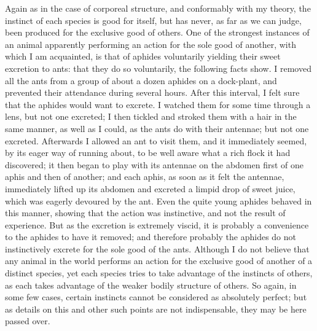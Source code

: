 \indent Again as in the case of corporeal structure, and conformably with my theory, the instinct of each species is good for itself, but has never, as far as we can judge, been produced for the exclusive good of others. One of the strongest instances of an animal apparently performing an action for the sole good of another, with which I am acquainted, is that of aphides voluntarily yielding their sweet excretion to ants: that they do so voluntarily, the following facts show. I removed all the ants from a group of about a dozen aphides on a dock-plant, and prevented their attendance during several hours. After this interval, I felt sure that the aphides would want to excrete. I watched them for some time through a lens, but not one excreted; I then tickled and stroked them with a hair in the same manner, as well as I could, as the ants do with their antennae; but not one excreted. Afterwards I allowed an ant to visit them, and it immediately seemed, by its eager way of running about, to be well aware what a rich flock it had discovered; it then began to play with its antennae on the abdomen first of one aphis and then of another; and each aphis, as soon as it felt the antennae, immediately lifted up its abdomen and excreted a limpid drop of sweet juice, which was eagerly devoured by the ant. Even the quite young aphides behaved in this manner, showing that the action was instinctive, and not the result of experience. But as the excretion is extremely viscid, it is probably a convenience to the aphides to have it removed; and therefore probably the aphides do not instinctively excrete for the sole good of the ants. Although I do not believe that any animal in the world performs an action for the exclusive good of another of a distinct species, yet each species tries to take advantage of the instincts of others, as each takes advantage of the weaker bodily structure of others.  So again, in some few cases, certain instincts cannot be considered as absolutely perfect; but as details on this and other such points are not indispensable, they may be here passed over.\\
